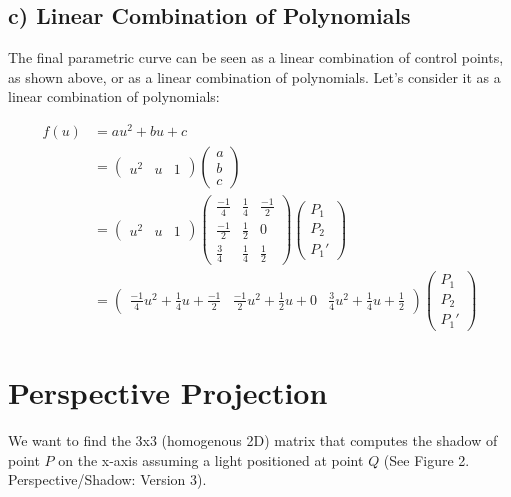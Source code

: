 \documentclass[12pt]{article}
\begin{document}
\subsection*{c) Linear Combination of Polynomials}

The final parametric curve can be seen as a linear combination of control points, 
as shown above, or as a linear combination of polynomials.
Let's consider it as a linear combination of polynomials:

\begin{align}
f(u) &= au^2 + bu + c \\
&=
\begin{pmatrix}
u^2 & u & 1
\end{pmatrix} \nonumber
\begin{pmatrix}
a \\
b \\
c
\end{pmatrix} \nonumber \\
&=
\begin{pmatrix}
u^2 & u & 1
\end{pmatrix} \nonumber
\begin{pmatrix}
{\frac{-1}{4}} & {\frac{1}{4}} & {\frac{-1}{2}} \\
{\frac{-1}{2}} & {\frac{1}{2}} & 0 \\
{\frac{3}{4}} & {\frac{1}{4}} & {\frac{1}{2}}  
\end{pmatrix} \nonumber
\begin{pmatrix}
P_1 \\
P_2 \\
P_1'
\end{pmatrix} \nonumber \\
&=
\begin{pmatrix}
{\frac{-1}{4}}u^2 + {\frac{1}{4}}u + {\frac{-1}{2}} &
{\frac{-1}{2}}u^2 + {\frac{1}{2}}u + 0 &
{\frac{3}{4}}u^2 + {\frac{1}{4}}u + {\frac{1}{2}}  
\end{pmatrix} \nonumber
\begin{pmatrix}
P_1 \\
P_2 \\
P_1'
\end{pmatrix} \nonumber

\end{align}

\section{Perspective Projection}

We want to find the 3x3 (homogenous 2D) matrix that 
computes the shadow of point $P$ on the x-axis assuming 
a light positioned at point $Q$ 
(See Figure 2. Perspective/Shadow: Version 3).
\end{document}
